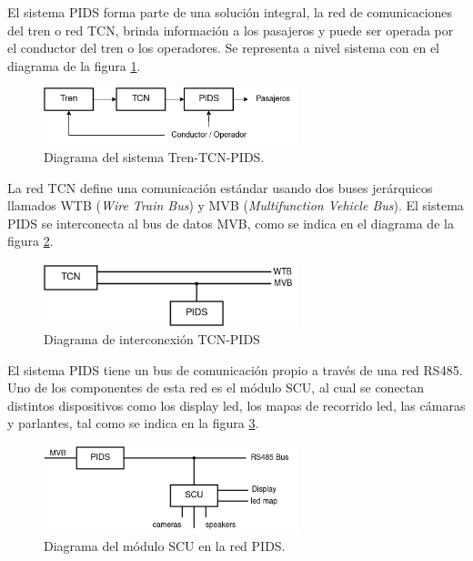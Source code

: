 El sistema PIDS forma parte de una solución integral, la red de comunicaciones del tren o red TCN, brinda información a los pasajeros y puede ser operada por el conductor del tren o los operadores. Se representa a nivel sistema con en el diagrama de la figura \ref{fig:diagTrenTcnPids}.\\

\begin{figure}[ht]
	\centering
	\includegraphics[width=0.66\textwidth]{./Figures/diagTrenTcnPids.png}
	\caption{Diagrama del sistema Tren-TCN-PIDS.}
	\label{fig:diagTrenTcnPids}
\end{figure}

La red TCN define una comunicación estándar usando dos buses jerárquicos llamados WTB (\textit{Wire Train Bus}) y MVB (\textit{Multifunction Vehicle Bus}). El sistema PIDS se interconecta al bus de datos MVB, como se indica en el diagrama de la figura \ref{fig:diagTcnPidsBuusesWtbMvb}.\\


\begin{figure}[ht]
	\centering
	\includegraphics[width=0.66\textwidth]{./Figures/diagTcnPidsBusesWtbMvb.png}
	\caption{Diagrama de interconexión TCN-PIDS}
	\label{fig:diagTcnPidsBuusesWtbMvb}
\end{figure}

El sistema PIDS tiene un bus de comunicación propio a través de una red RS485. Uno de los componentes de esta red es el módulo SCU, al cual se conectan distintos dispositivos como los display led, los mapas de recorrido led, las cámaras y parlantes, tal como se indica en la figura 	\ref{fig:diagPidsScuDevices}.\\


\begin{figure}[ht]
	\centering
	\includegraphics[width=0.66\textwidth]{./Figures/diagPidsScuDevices.png}
	\caption{Diagrama del módulo SCU en la red PIDS.}
	\label{fig:diagPidsScuDevices}
\end{figure}


